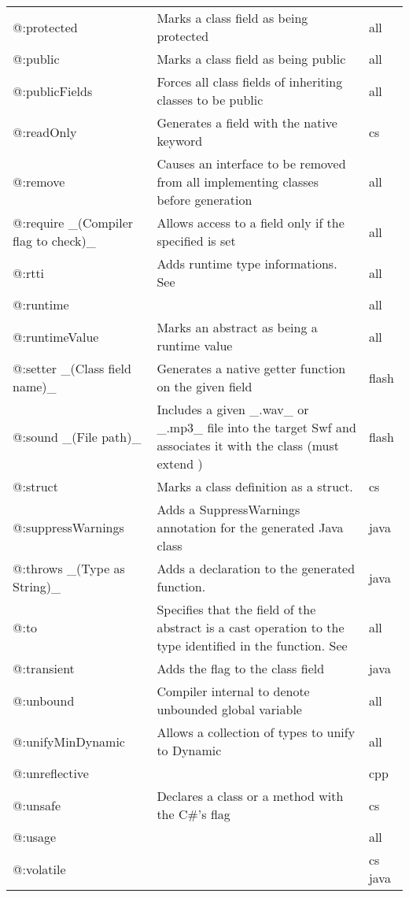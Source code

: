\begin{center}
\begin{tabular}{| l | l | l |}
	@:protected  &  Marks a class field as being protected  &  all \\
	@:public  &  Marks a class field as being public  &  all \\
	@:publicFields  &  Forces all class fields of inheriting classes to be public  &  all \\
	@:readOnly  &  Generates a field with the \expr{readonly} native keyword   &  cs \\
	@:remove  &  Causes an interface to be removed from all implementing classes before generation  &  all \\
	@:require \_(Compiler flag to check)\_  &  Allows access to a field only if the specified \tref{compiler flag}{lf-condition-compilation} is set  &  all \\
	@:rtti   &  Adds runtime type informations. See \tref{RTTI}{cr-rtti}  &  all \\
	@:runtime  &    &  all \\
	@:runtimeValue  &  Marks an abstract as being a runtime value  &  all \\
	@:setter \_(Class field name)\_  &  Generates a native getter function on the given field   &  flash \\
	@:sound \_(File path)\_  &  Includes a given \_.wav\_ or \_.mp3\_ file into the target Swf and associates it with the class (must extend \expr{flash.media.Sound})  &  flash \\
	@:struct  &  Marks a class definition as a struct.   &  cs \\
	@:suppressWarnings  &  Adds a SuppressWarnings annotation for the generated Java class  &  java \\
	@:throws \_(Type as String)\_  &  Adds a \expr{throws} declaration to the generated function.   &  java \\
	@:to  &  Specifies that the field of the abstract is a cast operation to the type identified in the function. See \tref{Implicit Casts}{types-abstract-implicit-casts} & all \\
	@:transient  &  Adds the \expr{transient} flag to the class field  &  java \\
	@:unbound  &  Compiler internal to denote unbounded global variable  &  all \\
	@:unifyMinDynamic  &  Allows a collection of types to unify to Dynamic  &  all \\
	@:unreflective  &    &  cpp \\
	@:unsafe  &  Declares a class  or a method with the C\#'s \expr{unsafe} flag   &  cs \\
	@:usage  &    &  all \\
	@:volatile  &    &  cs  java \\
\end{tabular}
\end{center}

